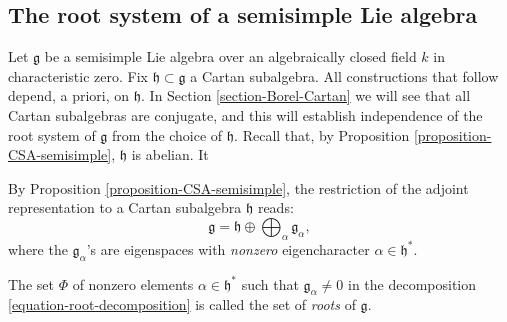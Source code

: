 \subsection{The root system of a semisimple Lie algebra}
\label{subsection-root-systems}

Let $\mathfrak g$ be a semisimple Lie algebra over an algebraically closed field $k$ in characteristic zero. Fix $\mathfrak h\subset \mathfrak g$ a Cartan subalgebra. All constructions that follow depend, a priori, on $\mathfrak h$. In Section \ref{section-Borel-Cartan} we will see that all Cartan subalgebras are conjugate, and this will establish independence of the root system of $\mathfrak g$ from the choice of $\mathfrak h$. Recall that, by Proposition \ref{proposition-CSA-semisimple}, $\mathfrak h$ is abelian. It


By Proposition \ref{proposition-CSA-semisimple}, the restriction of the adjoint representation to a Cartan subalgebra $\mathfrak h$ reads:
\begin{equation}
 \label{equation-root-decomposition}\mathfrak g = \mathfrak h \oplus \bigoplus_{\alpha}  \mathfrak g_\alpha,
\end{equation}
where the $\mathfrak g_\alpha$'s are eigenspaces with \emph{nonzero} eigencharacter $\alpha \in \mathfrak h^*$.


\begin{definition}
 \label{definition-roots}
The set $\Phi$ of nonzero elements $\alpha \in \mathfrak h^*$ such that $\mathfrak g_\alpha\ne 0$ in the decomposition \eqref{equation-root-decomposition} is called the set of {\it roots} of $\mathfrak g$.
\end{definition}

